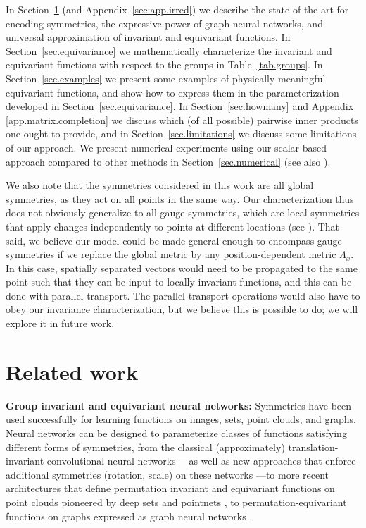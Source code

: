 \documentclass{article}
\renewcommand{\paragraph}[1]{\par\textbf{#1}}
\theoremstyle{Hogg}
\begin{document}
In Section~\ref{sec.related} (and Appendix~\ref{sec:app.irred}) we describe the state of the art for encoding symmetries, the expressive power of graph neural networks, and universal approximation of invariant and equivariant functions.
In Section~\ref{sec.equivariance} we mathematically characterize the invariant and equivariant functions with respect to the groups in Table~\ref{tab.groups}.
In Section~\ref{sec.examples} we present some examples of physically meaningful equivariant functions, and show how to express them in the parameterization developed in Section~\ref{sec.equivariance}.
In Section~\ref{sec.howmany} and Appendix \ref{app.matrix.completion} we discuss which (of all possible) pairwise inner products one ought to provide, and in Section~\ref{sec.limitations} we discuss some limitations of our approach.
We present numerical experiments using our scalar-based approach compared to other methods in Section~\ref{sec.numerical} (see also \cite{yao2021simple}).

We also note that the symmetries considered in this work are all global symmetries, as they act on all points in the same way.
Our characterization thus does not obviously generalize to all gauge symmetries, which are local symmetries that apply changes independently to points at different locations (see \cite{Bronstein2021GeometricDL, weiler2021coordinate}).
That said, we believe our model could be made general enough to encompass gauge symmetries if we replace the global metric by any position-dependent metric $\Lambda_x$. 
In this case, spatially separated vectors would need to be propagated to the same point such that they can be input to locally invariant functions, and this can be done with parallel transport.
The parallel transport operations would also have to obey our invariance characterization, but we believe this is possible to do; we will explore it in future work.


\section{Related work} \label{sec.related}

\paragraph{Group invariant and equivariant neural networks:}
Symmetries have been used successfully for learning functions on images, sets, point clouds, and graphs. Neural networks can be designed to parameterize classes of functions satisfying different forms of symmetries, from the classical (approximately) translation-invariant convolutional neural networks \cite{lecun1989backpropagation}---as well as new approaches that enforce additional symmetries (rotation, scale) on these networks \cite{wang2021incorporating, fuchs2020se, thomas2018tensor}---to more recent architectures that define permutation invariant and equivariant functions on point clouds pioneered by deep sets and pointnets \cite{zaheer2017deep, qi2017pointnet, qi2017pointnet++}, to permutation-equivariant functions on graphs expressed as graph neural networks \cite{gori2005new, scarselli2008graph, kipf2016semi, duvenaud2015convolutional, gilmer2017neural,  chen2019cdsbm}.
\end{document}

